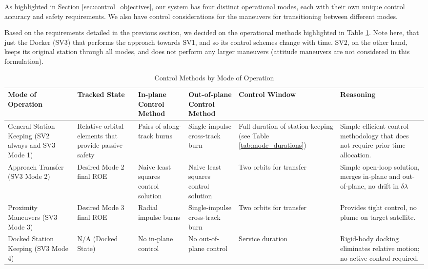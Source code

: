 As highlighted in Section \ref{sec:control_objectives}, our system has four distinct operational modes, each with their own unique control accuracy and safety requirements. We also have control considerations for the maneuvers for transitioning between different modes.

Based on the requirements detailed in the previous section, we decided on the operational methods highlighted in Table \ref{tab:mode_control_methods}. Note here, that just the Docker (SV3) that performs the approach towards SV1, and so its control schemes change with time. SV2, on the other hand, keeps its original station through all modes, and does not perform any larger maneuvers (attitude maneuvers are not considered in this formulation).


\begin{table}[H]
    \centering
    \caption{Control Methods by Mode of Operation}
    \renewcommand{\arraystretch}{1.3}

    \begin{tabularx}{\textwidth}{|>{\raggedright\arraybackslash}p{}|%
                                      >{\raggedright\arraybackslash}p{}|%
                                      >{\raggedright\arraybackslash}p{}|%
                                      >{\raggedright\arraybackslash}p{}|%
                                      >{\raggedright\arraybackslash}p{}|%
                                      >{\raggedright\arraybackslash}X|}
        \rowcolor{lightgray}
        \hline
        \textbf{Mode of Operation} & \textbf{Tracked State} & \textbf{In-plane Control Method} & \textbf{Out-of-plane Control Method} & \textbf{Control Window} & \textbf{Reasoning} \\
        \hline
        General Station Keeping (SV2 always and SV3 Mode 1) & Relative orbital elements that provide passive safety & Pairs of along-track burns & Single impulse cross-track burn & Full duration of station-keeping (see Table \ref{tab:mode_durations}) & Simple efficient control methodology that does not require prior time allocation. \\
        \hline
        Approach Transfer (SV3 Mode 2) & Desired Mode 2 final ROE & Naive least squares control solution & Naive least squares control solution & Two orbits for transfer & Simple open-loop solution, merges in-plane and out-of-plane, no drift in $\delta \lambda$ \\
        \hline
        Proximity Maneuvers (SV3 Mode 3) & Desired Mode 3 final ROE & Radial impulse burns & Single-impulse cross-track burn & Two orbits for transfer & Provides tight control, no plume on target satellite. \\
        \hline
        Docked Station Keeping (SV3 Mode 4) & N/A (Docked State) & No in-plane control & No out-of-plane control & Service duration & Rigid-body docking eliminates relative motion; no active control required. \\
        \hline
    \end{tabularx}
    \label{tab:mode_control_methods}
\end{table}



